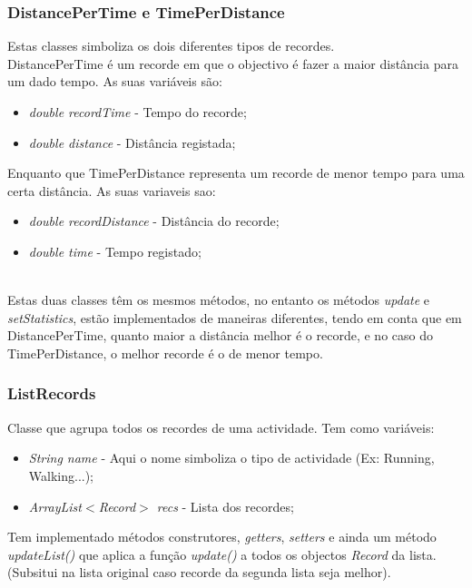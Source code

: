 \documentclass[10pt,notitlepage]{article}
\begin{document}
\subsubsection{DistancePerTime e TimePerDistance}
Estas classes simboliza os dois diferentes tipos de recordes.\\

DistancePerTime é um recorde em que o objectivo é fazer a maior distância para um dado tempo.  
As suas variáveis são:
\begin{itemize}
\item \textit{double recordTime} - Tempo do recorde;
\item \textit{double distance} - Distância registada;
\end{itemize}
Enquanto que TimePerDistance representa um recorde de menor tempo para uma certa distância.
As suas variaveis sao:
\begin{itemize}
\item \textit{double recordDistance} - Distância do recorde;
\item \textit{double time} - Tempo registado;
\end{itemize}
~\\
Estas duas classes têm os mesmos métodos, no entanto os métodos \textit{update} e \textit{setStatistics}, estão implementados de maneiras diferentes, tendo em conta que em DistancePerTime, quanto maior a distância melhor é o recorde, e no caso do TimePerDistance,  o melhor recorde é o de menor tempo.


\subsubsection{ListRecords}

Classe que agrupa todos os recordes de uma actividade. Tem como variáveis:
\begin{itemize}
\item \textit{String name} - Aqui o nome simboliza o tipo de actividade (Ex: Running, Walking...);
\item \textit{ArrayList$<$Record$>$ recs} - Lista dos recordes;
\end{itemize}
Tem implementado métodos construtores, \textit{getters}, \textit{setters} e ainda um método \textit{updateList()} que aplica a função \textit{update()} a todos os objectos \textit{Record} da lista. (Subsitui na lista original caso recorde da segunda lista seja melhor).
\end{document}

